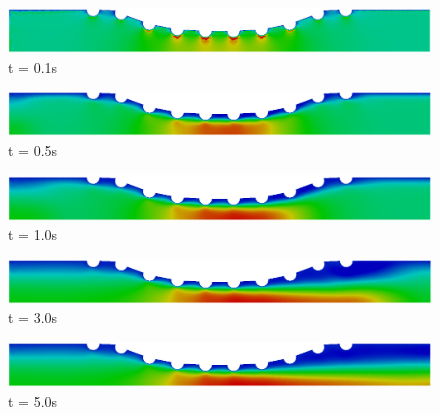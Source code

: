 \vspace{2cm} 
\begin{figure}[H]
     \begin{minipage}{.50\linewidth}
      \centering
      \includegraphics[scale=0.18]{./02_chaps/cap_solution/figure/vel_CurvedStrut1.png}\\
      t = 0.1s
     \end{minipage}%
     \begin{minipage}{.50\linewidth}
      \centering
      \includegraphics[scale=0.18]{./02_chaps/cap_solution/figure/vel_CurvedStrut2.png}\\
      t = 0.5s
     \end{minipage}
     \begin{minipage}{.50\linewidth}
     \medskip
      \centering
      \includegraphics[scale=0.18]{./02_chaps/cap_solution/figure/vel_CurvedStrut3.png}\\
      t = 1.0s
     \end{minipage}%
     \begin{minipage}{.50\linewidth}
     \medskip
      \centering
      \includegraphics[scale=0.18]{./02_chaps/cap_solution/figure/vel_CurvedStrut4.png}\\
      t = 3.0s
     \end{minipage}
     \begin{minipage}{.50\linewidth}
      \centering
      \includegraphics[scale=0.18]{./02_chaps/cap_solution/figure/vel_CurvedStrut5.png}\\
      t = 5.0s
     \end{minipage}%

\end{figure}
